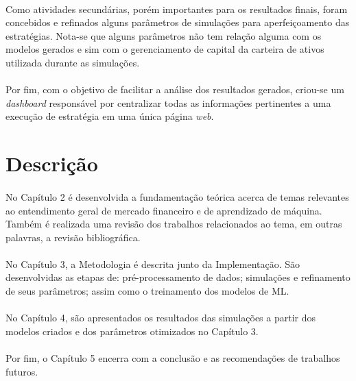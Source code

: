 \paragraph{} Como atividades secundárias, porém importantes para os resultados finais, foram concebidos e refinados alguns parâmetros de simulações para aperfeiçoamento das estratégias. Nota-se que alguns parâmetros não tem relação alguma com os modelos gerados e sim com o gerenciamento de capital da carteira de ativos utilizada durante as simulações.

\paragraph{} Por fim, com o objetivo de facilitar a análise dos resultados gerados, criou-se um \textit{dashboard} responsável por centralizar todas as informações pertinentes a uma execução de estratégia em uma única página \textit{web}.




\FloatBarrier
\section{Descrição}

\paragraph{} No Capítulo 2 é desenvolvida a fundamentação teórica acerca de temas relevantes ao entendimento geral de mercado financeiro e de aprendizado de máquina. Também é realizada uma revisão dos trabalhos relacionados ao tema, em outras palavras, a revisão bibliográfica.

\paragraph{} No Capítulo 3, a Metodologia é descrita junto da Implementação. São desenvolvidas as etapas de: pré-processamento de dados; simulações e refinamento de seus parâmetros; assim como o treinamento dos modelos de ML.

\paragraph{} No Capítulo 4, são apresentados os resultados das simulações a partir dos modelos criados e dos parâmetros otimizados no Capítulo 3.

\paragraph{} Por fim, o Capítulo 5 encerra com a conclusão e as recomendações de trabalhos futuros.